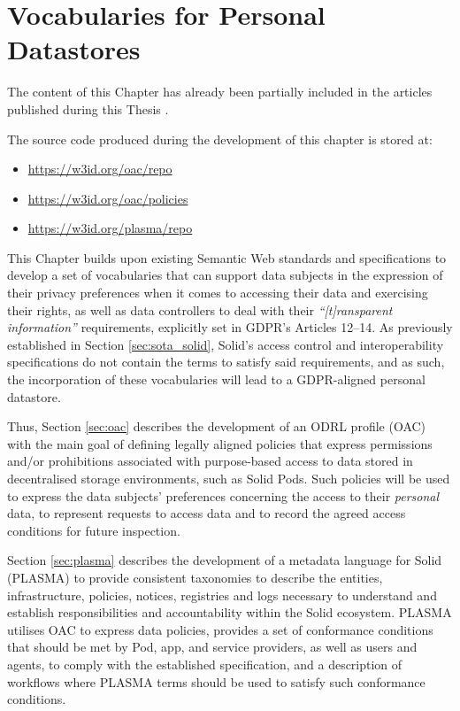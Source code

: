 \chapter{Vocabularies for Personal Datastores}
\label{chap:vocabularies}

\begin{tcolorbox}[colback=royallavender!40]
The content of this Chapter has already been partially included in the articles published during this Thesis \citep{esteves_odrl_2021,esteves_using_2023,esteves_fostering_2022}.
\end{tcolorbox}

\begin{tcolorbox}[colback=royallavender!10]
The source code produced during the development of this chapter is stored at:
\begin{itemize}
    \item \url{https://w3id.org/oac/repo}
    \item \url{https://w3id.org/oac/policies}
    \item \url{https://w3id.org/plasma/repo}
\end{itemize}
\end{tcolorbox}

This Chapter builds upon existing Semantic Web standards and specifications to develop a set of vocabularies that can support data subjects in the expression of their privacy preferences when it comes to accessing their data and exercising their rights, as well as data controllers to deal with their \textit{``[t]ransparent information''} requirements, explicitly set in GDPR's Articles 12--14.
As previously established in Section \ref{sec:sota_solid}, Solid's access control and interoperability specifications do not contain the terms to satisfy said requirements, and as such, the incorporation of these vocabularies will lead to a GDPR-aligned personal datastore.

Thus, Section \ref{sec:oac} describes the development of an ODRL profile (OAC) with the main goal of defining legally aligned policies that express permissions and/or prohibitions associated with purpose-based access to data stored in decentralised storage environments, such as Solid Pods.
Such policies will be used to express the data subjects' preferences concerning the access to their \textit{personal} data, to represent requests to access data and to record the agreed access conditions for future inspection.

Section \ref{sec:plasma} describes the development of a metadata language for Solid (PLASMA) to provide consistent taxonomies to describe the entities, infrastructure, policies, notices, registries and logs necessary to understand and establish responsibilities and accountability within the Solid ecosystem.
PLASMA utilises OAC to express data policies, provides a set of conformance conditions that should be met by Pod, app, and service providers, as well as users and agents, to comply with the established specification, and a description of workflows where PLASMA terms should be used to satisfy such conformance conditions.

